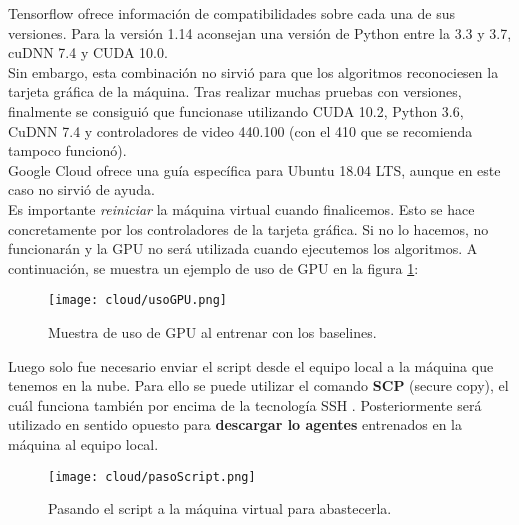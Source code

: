 \documentclass[11pt,fleqn]{book} %
\begin{document}
Tensorflow ofrece información de compatibilidades \cite{article:compatibilidades} sobre cada una de sus versiones. Para la versión 1.14 aconsejan una versión de Python entre la 3.3 y 3.7, cuDNN 7.4 y CUDA 10.0. \\

Sin embargo, esta combinación no sirvió para que los algoritmos reconociesen la tarjeta gráfica de la máquina. Tras realizar muchas pruebas con versiones, finalmente se consiguió que funcionase utilizando CUDA 10.2, Python 3.6, CuDNN 7.4 y controladores de video 440.100 (con el 410 que se recomienda tampoco funcionó). \\

Google Cloud ofrece una guía específica para Ubuntu 18.04 LTS, aunque en este caso no sirvió de ayuda. \cite{article:GPUgoogle} \\

Es importante \textit{reiniciar} la máquina virtual cuando finalicemos. Esto se hace concretamente por los controladores de la tarjeta gráfica. Si no lo hacemos, no funcionarán y la GPU no será utilizada cuando ejecutemos los algoritmos. A continuación, se muestra un ejemplo de uso de GPU en la figura \ref{fig:usoGPU}:

\begin{figure}[H]
	\centering\texttt{[image: cloud/usoGPU.png]}
	\caption{Muestra de uso de GPU al entrenar con los baselines.}
	\label{fig:usoGPU} %
\end{figure} 

Luego solo fue necesario enviar el script desde el equipo local a la máquina que tenemos en la nube. Para ello se puede utilizar el comando \textbf{SCP} (secure copy), el cuál funciona también por encima de la tecnología SSH \cite{article:scp}. Posteriormente será utilizado en sentido opuesto para \textbf{descargar lo agentes} entrenados en la máquina al equipo local. \\

\begin{figure}[H]
	\centering\texttt{[image: cloud/pasoScript.png]}
	\caption{Pasando el script a la máquina virtual para abastecerla.}
	\label{fig:usoSCP} %
\end{figure} 
\end{document}
